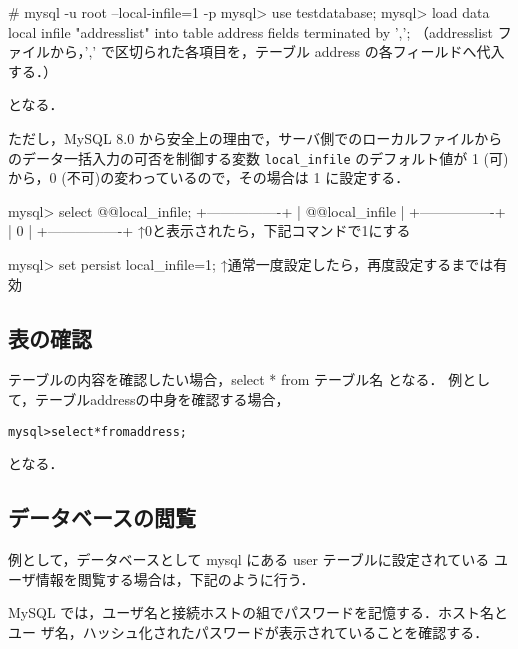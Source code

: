 \begin{cli}
# mysql -u root --local-infile=1 -p
mysql> use testdatabase;
mysql> load data local infile "addresslist" into table address fields
terminated by ',';
（addresslist ファイルから，',' で区切られた各項目を，テーブル address の各フィールドへ代入する．）
\end{cli}
となる．

ただし，MySQL 8.0 から安全上の理由で，サーバ側でのローカルファイルからのデータ一括入力の可否を制御する変数 \texttt{local\_infile} のデフォルト値が 1 (可)から，0 (不可)の変わっているので，その場合は 1 に設定する．

\begin{cli}
mysql> select @@local_infile;
+----------------+
| @@local_infile |
+----------------+
|              0 |
+----------------+
↑0と表示されたら，下記コマンドで1にする

mysql> set persist local_infile=1;
↑通常一度設定したら，再度設定するまでは有効
\end{cli}

\subsection*{表の確認}
テーブルの内容を確認したい場合，select * from テーブル名 となる．
例として，テーブルaddressの中身を確認する場合，
	\begin{center}
	\begin{breakbox}
	\begin{alltt}
		mysql> select * from address;
	\end{alltt}
	\end{breakbox}
	\end{center}
となる．

\subsection*{データベースの閲覧}
例として，データベースとして mysql にある user テーブルに設定されている
ユーザ情報を閲覧する場合は，下記のように行う．

MySQL では，ユーザ名と接続ホストの組でパスワードを記憶する．ホスト名とユー
ザ名，ハッシュ化されたパスワードが表示されていることを確認する．

